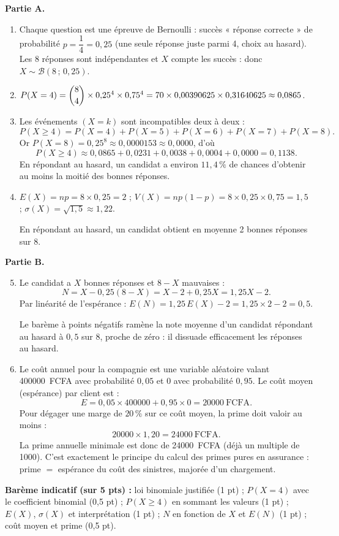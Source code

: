 \documentclass[11pt]{article}
\begin{document}
\begin{corrige}
\textbf{Partie A.}
\begin{enumerate}
\item Chaque question est une épreuve de Bernoulli : succès « réponse correcte » de probabilité $p=\dfrac{1}{4}=0{,}25$ (une seule réponse juste parmi 4, choix au hasard). Les 8 réponses sont indépendantes et $X$ compte les succès : donc $X\sim\mathcal{B}(8\,;\,0{,}25)$.
\item $P(X=4)=\dbinom{8}{4}\times 0{,}25^4\times 0{,}75^4=70\times 0{,}00390625\times 0{,}31640625\approx 0{,}0865$.
\item Les événements $(X=k)$ sont incompatibles deux à deux :
\[P(X\ge 4)=P(X=4)+P(X=5)+P(X=6)+P(X=7)+P(X=8).\]
Or $P(X=8)=0{,}25^8\approx 0{,}0000153\approx 0{,}0000$, d'où
\[P(X\ge 4)\approx 0{,}0865+0{,}0231+0{,}0038+0{,}0004+0{,}0000=0{,}1138.\]
En répondant au hasard, un candidat a environ $11{,}4\,\%$ de chances d'obtenir au moins la moitié des bonnes réponses.
\item $E(X)=np=8\times 0{,}25=2$ ; \quad $V(X)=np(1-p)=8\times 0{,}25\times 0{,}75=1{,}5$ ; \quad $\sigma(X)=\sqrt{1{,}5}\approx 1{,}22$.

En répondant au hasard, un candidat obtient en moyenne 2 bonnes réponses sur 8.
\end{enumerate}

\textbf{Partie B.}
\begin{enumerate}
\setcounter{enumi}{4}
\item Le candidat a $X$ bonnes réponses et $8-X$ mauvaises :
\[N=X-0{,}25(8-X)=X-2+0{,}25X=1{,}25X-2.\]
Par linéarité de l'espérance : $E(N)=1{,}25\,E(X)-2=1{,}25\times 2-2=0{,}5$.

Le barème à points négatifs ramène la note moyenne d'un candidat répondant au hasard à $0{,}5$ sur 8, proche de zéro : il dissuade efficacement les réponses au hasard.
\item Le coût annuel pour la compagnie est une variable aléatoire valant \SI{400000}{FCFA} avec probabilité $0{,}05$ et $0$ avec probabilité $0{,}95$. Le coût moyen (espérance) par client est :
\[E=0{,}05\times 400000+0{,}95\times 0=20000\ \text{FCFA}.\]
Pour dégager une marge de $20\,\%$ sur ce coût moyen, la prime doit valoir au moins :
\[20000\times 1{,}20=24000\ \text{FCFA}.\]
La prime annuelle minimale est donc de \SI{24000}{FCFA} (déjà un multiple de 1000). C'est exactement le principe du calcul des primes pures en assurance : prime $=$ espérance du coût des sinistres, majorée d'un chargement.
\end{enumerate}
\textbf{Barème indicatif (sur 5 pts) :} loi binomiale justifiée (1 pt) ; $P(X=4)$ avec le coefficient binomial (0,5 pt) ; $P(X\ge 4)$ en sommant les valeurs (1 pt) ; $E(X)$, $\sigma(X)$ et interprétation (1 pt) ; $N$ en fonction de $X$ et $E(N)$ (1 pt) ; coût moyen et prime (0,5 pt).


\end{corrige}
\end{document}
